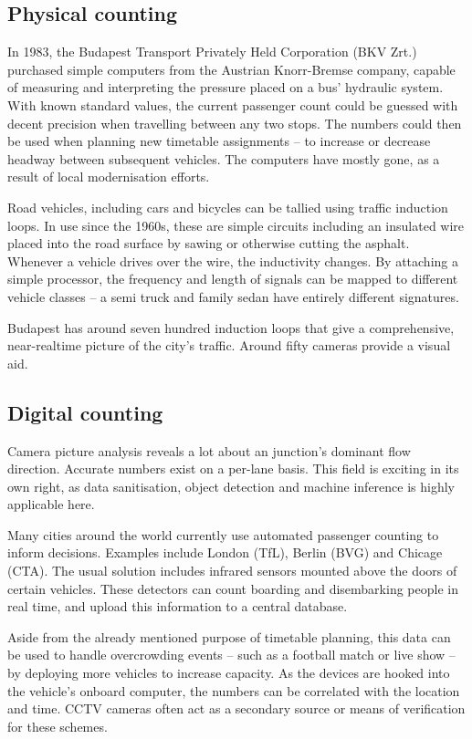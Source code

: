 \subsection{Physical counting}

In 1983, the Budapest Transport Privately Held Corporation (BKV Zrt.) purchased simple computers from the Austrian Knorr-Bremse company, capable of measuring and interpreting the pressure placed on a bus' hydraulic system.\cite{ik260_article} With known standard values, the current passenger count could be guessed with decent precision when travelling between any two stops. The numbers could then be used when planning new timetable assignments -- to increase or decrease headway between subsequent vehicles. The computers have mostly gone, as a result of local modernisation efforts.

Road vehicles, including cars and bicycles can be tallied using traffic induction loops.\cite{fhwaLoop} In use since the 1960s, these are simple circuits including an insulated wire placed into the road surface by sawing or otherwise cutting the asphalt. Whenever a vehicle drives over the wire, the inductivity changes. By attaching a simple processor, the frequency and length of signals can be mapped to different vehicle classes -- a semi truck and family sedan have entirely different signatures.

Budapest has around seven hundred induction loops that give a comprehensive, near-realtime picture of the city's traffic. Around fifty cameras provide a visual aid.\cite{BkkDataCollection}

\subsection{Digital counting}
Camera picture analysis reveals a lot about an junction's dominant flow direction. Accurate numbers exist on a per-lane basis. This field is exciting in its own right, as data sanitisation, object detection and machine inference is highly applicable here.

Many cities around the world currently use automated passenger counting to inform decisions. Examples include London (TfL), Berlin (BVG) and Chicage (CTA). The usual solution includes infrared sensors mounted above the doors of certain vehicles. These detectors can count boarding and disembarking people in real time, and upload this information to a central database.

Aside from the already mentioned purpose of timetable planning, this data can be used to handle overcrowding events -- such as a football match or live show -- by deploying more vehicles to increase capacity. As the devices are hooked into the vehicle's onboard computer, the numbers can be correlated with the location and time. CCTV cameras often act as a secondary source or means of verification for these schemes.


